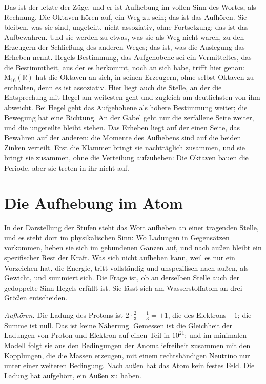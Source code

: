 \documentclass[11pt,a4paper]{article}
\newcommand{\Randlesart}{\marginpar{\raggedright\footnotesize\textcolor{lesart}{$\bigcirc$\,Lesart}}}
\newcommand{\R}{\mathbb R}
\newcommand{\M}{\mathrm M}
\begin{document}
\Randlesart Das ist der letzte der Züge, und er ist Aufhebung im vollen Sinn des Wortes, als Rechnung. Die Oktaven hören auf, ein Weg zu sein; das ist das Aufhören. Sie bleiben, was sie sind, ungeteilt, nicht assoziativ, ohne Fortsetzung; das ist das Aufbewahren. Und sie werden zu etwas, was sie als Weg nicht waren, zu den Erzeugern der Schließung des anderen Weges; das ist, was die Auslegung das Erheben nennt. Hegels Bestimmung, das Aufgehobene sei ein Vermitteltes, das die Bestimmtheit, aus der es herkommt, noch an sich habe, trifft hier genau: $\M_{16}(\R)$ hat die Oktaven an sich, in seinen Erzeugern, ohne selbst Oktaven zu enthalten, denn es ist assoziativ. Hier liegt auch die Stelle, an der die Entsprechung mit Hegel am weitesten geht und zugleich am deutlichsten von ihm abweicht. Bei Hegel geht das Aufgehobene als höhere Bestimmung weiter; die Bewegung hat eine Richtung. An der Gabel geht nur die zerfallene Seite weiter, und die ungeteilte bleibt stehen. Das Erheben liegt auf der einen Seite, das Bewahren auf der anderen; die Momente des Aufhebens sind auf die beiden Zinken verteilt. Erst die Klammer bringt sie nachträglich zusammen, und sie bringt sie zusammen, ohne die Verteilung aufzuheben: Die Oktaven bauen die Periode, aber sie treten in ihr nicht auf.

\section{Die Aufhebung im Atom}
\label{sec:aufhebung}

In der Darstellung der Stufen steht das Wort aufheben an einer tragenden Stelle, und es steht dort im physikalischen Sinn: Wo Ladungen in Gegensätzen vorkommen, heben sie sich im gebundenen Ganzen auf, und nach außen bleibt ein spezifischer Rest der Kraft. Was sich nicht aufheben kann, weil es nur ein Vorzeichen hat, die Energie, tritt vollständig und unspezifisch nach außen, als Gewicht, und summiert sich. Die Frage ist, ob an derselben Stelle auch der gedoppelte Sinn Hegels erfüllt ist. Sie lässt sich am Wasserstoffatom an drei Größen entscheiden.

\emph{Aufhören.} Die Ladung des Protons ist $2\cdot\tfrac23-\tfrac13=+1$, die des Elektrons $-1$; die Summe ist null. Das ist keine Näherung. Gemessen ist die Gleichheit der Ladungen von Proton und Elektron auf einen Teil in $10^{21}$; und im minimalen Modell folgt sie aus den Bedingungen der Anomaliefreiheit zusammen mit den Kopplungen, die die Massen erzeugen, mit einem rechtshändigen Neutrino nur unter einer weiteren Bedingung. Nach außen hat das Atom kein festes Feld. Die Ladung hat aufgehört, ein Außen zu haben.
\end{document}
